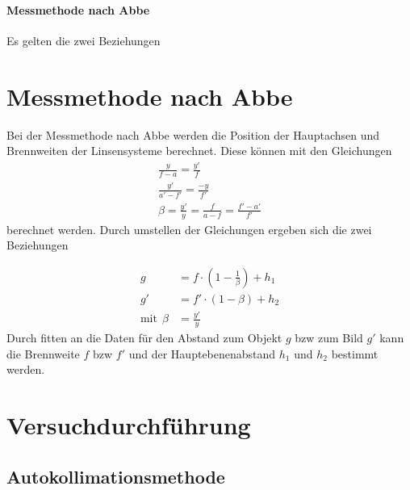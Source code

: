\documentclass[11pt, a4paper]{article}
\begin{document}
    \paragraph{Messmethode nach Abbe}
    Es gelten die zwei Beziehungen

    \section{Messmethode nach Abbe}
    Bei der Messmethode nach Abbe werden die Position der Hauptachsen und Brennweiten der Linsensysteme berechnet. Diese können mit den Gleichungen
    \begin{align}
        \frac{y}{f-a} = \frac{y'}{f} \\
        \frac{y'}{a'-f'} = \frac{-y}{f'} \\
        \beta = \frac{y'}{y} = \frac{f}{a-f} = \frac{f'-a'}{f'}
    \end{align}
    berechnet werden. Durch umstellen der Gleichungen ergeben sich die zwei Beziehungen

    \begin{align}
        g &= f \cdot \left(1 - \frac{1}{\beta}\right) + h_1 \label{eq:dicke1} \\
        g' &= f' \cdot (1 - \beta) + h_2 \label{eq:dicke2} \\
        \text{mit} \ \ \beta &= \frac{y'}{y}
    \end{align}
    Durch fitten an die Daten für den Abstand zum Objekt $g$ bzw zum Bild $g'$ kann die Brennweite $f$ bzw $f'$ und der Hauptebenenabstand $h_1$ und $h_2$ bestimmt werden.


    \section{Versuchdurchführung}

    \subsection{Autokollimationsmethode} %
\end{document}
